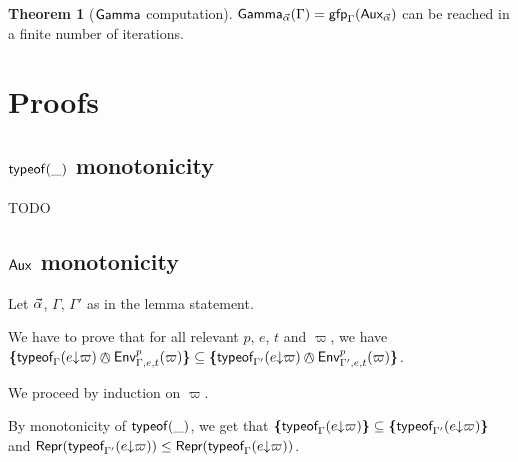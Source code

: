 \documentclass[a4paper]{article}
\theoremstyle{definition}
\newtheorem{theorem}{Theorem}
\begin{document}
        \begin{theorem}[$\textsf{Gamma}_{}$ computation]
          $\textsf{Gamma}_{\vec \alpha}(\Gamma)=\textsf{gfp}_\Gamma (\textsf{Aux}_{\vec \alpha})$ can be reached in a finite number of iterations.
        \end{theorem}

    \section{Proofs}

    \subsection{$\textsf{typeof}_{}(\_)$ monotonicity}
    
    TODO

    \subsection{$\textsf{Aux}_{}$ monotonicity}

      Let $\vec \alpha$, $\Gamma$, $\Gamma'$ as in the lemma statement.

      We have to prove that for all relevant $p$, $e$, $t$ and $\varpi$,
      we have $\tsint {\tyof {\occ e \varpi} {\Gamma} \tsand \Gp p {\Gamma,e,t} (\varpi)} \subseteq \tsint {\tyof {\occ e \varpi} {\Gamma'} \tsand \Gp p {\Gamma',e,t} (\varpi)}$.

      We proceed by induction on $\varpi$. 

      By monotonicity of $\textsf{typeof}_{}(\_)$, we get that
      $\textbf{\textup{\{}}\textsf{typeof}_{\Gamma}(e{\downarrow}\varpi)\textbf{\textup{\}}} \subseteq \textbf{\textup{\{}}\textsf{typeof}_{\Gamma'}(e{\downarrow}\varpi)\textbf{\textup{\}}}$
      and $\textsf{Repr}(\textsf{typeof}_{\Gamma'}(e{\downarrow}\varpi)) \leq \textsf{Repr}(\textsf{typeof}_{\Gamma}(e{\downarrow}\varpi))$.
\end{document}
